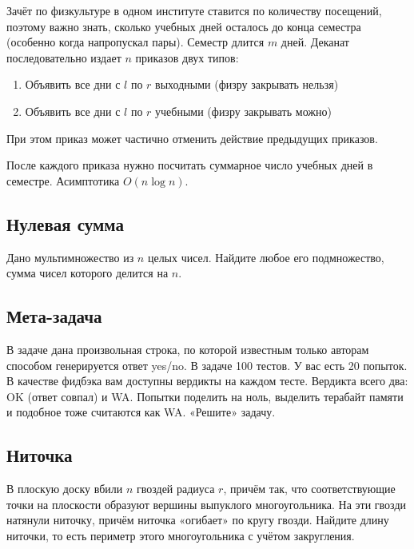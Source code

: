 \documentclass[11pt]{article}
\providecommand{\tightlist}{%
      \setlength{\itemsep}{0pt}\setlength{\parskip}{0pt}}
\begin{document}
Зачёт по физкультуре в одном институте ставится по количеству посещений,
поэтому важно знать, сколько учебных дней осталось до конца семестра
(особенно когда напропускал пары). Семестр длится \(m\) дней. Деканат
последовательно издает \(n\) приказов двух типов:

\begin{enumerate}
\def\labelenumi{\arabic{enumi}.}
\tightlist
\item
  Объявить все дни с \(l\) по \(r\) выходными (физру закрывать нельзя)
\item
  Объявить все дни с \(l\) по \(r\) учебными (физру закрывать можно)
\end{enumerate}

При этом приказ может частично отменить действие предыдущих приказов.

После каждого приказа нужно посчитать суммарное число учебных дней в
семестре. Асимптотика \(O(n \log n)\).

    \subsection{Нулевая
сумма}\label{ux43dux443ux43bux435ux432ux430ux44f-ux441ux443ux43cux43cux430}

Дано мультимножество из \(n\) целых чисел. Найдите любое его
подмножество, сумма чисел которого делится на \(n\).

    \subsection{Мета-задача}\label{ux43cux435ux442ux430-ux437ux430ux434ux430ux447ux430}

В задаче дана произвольная строка, по которой известным только авторам
способом генерируется ответ yes/no. В задаче 100 тестов. У вас есть 20
попыток. В качестве фидбэка вам доступны вердикты на каждом тесте.
Вердикта всего два: OK (ответ совпал) и WA. Попытки поделить на ноль,
выделить терабайт памяти и подобное тоже считаются как WA. «Решите»
задачу.

    \subsection{Ниточка}\label{ux43dux438ux442ux43eux447ux43aux430}

В плоскую доску вбили \(n\) гвоздей радиуса \(r\), причём так, что
соответствующие точки на плоскости образуют вершины выпуклого
многоугольника. На эти гвозди натянули ниточку, причём ниточка «огибает»
по кругу гвозди. Найдите длину ниточки, то есть периметр этого
многоугольника с учётом закругления.
\end{document}
